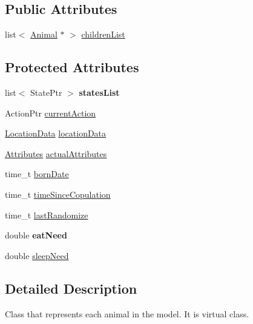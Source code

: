\subsection*{Public Attributes}
\begin{DoxyCompactItemize}
\item 
list$<$ \hyperlink{class_animal}{Animal} $\ast$ $>$ \hyperlink{class_animal_a94a0b9dc3fa747aea4eaed4d615bcb32}{children\+List}
\end{DoxyCompactItemize}
\subsection*{Protected Attributes}
\begin{DoxyCompactItemize}
\item 
\hypertarget{class_animal_aaa6816af2bd90c9988e1393fc2b57199}{}list$<$ State\+Ptr $>$ {\bfseries states\+List}\label{class_animal_aaa6816af2bd90c9988e1393fc2b57199}

\item 
Action\+Ptr \hyperlink{class_animal_ab0da50ec5f81ba73009c4c658753a03d}{current\+Action}
\item 
\hyperlink{struct_location_data}{Location\+Data} \hyperlink{class_animal_a2f521f0bb872d3ffe82e4f0d1e816abe}{location\+Data}
\item 
\hyperlink{class_attributes}{Attributes} \hyperlink{class_animal_a717f0c6ca49f0b22eaf1a7198f1e1a1b}{actual\+Attributes}
\item 
time\+\_\+t \hyperlink{class_animal_aefbe1292bd5be337de52faf38d9b4862}{born\+Date}
\item 
time\+\_\+t \hyperlink{class_animal_a944296b52e238a919c56f3738bd31989}{time\+Since\+Copulation}
\item 
time\+\_\+t \hyperlink{class_animal_aed941628e1e462bb2199398db8251192}{last\+Randomize}
\item 
\hypertarget{class_animal_a682b0dadf7726ee266415c27b351de42}{}double {\bfseries eat\+Need}\label{class_animal_a682b0dadf7726ee266415c27b351de42}

\item 
double \hyperlink{class_animal_abfdde3c7e89db79ef04abc9312648206}{sleep\+Need}
\end{DoxyCompactItemize}


\subsection{Detailed Description}
Class that represents each animal in the model. It is virtual class. 

